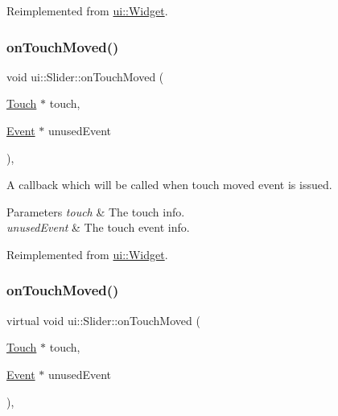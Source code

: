 Reimplemented from \hyperlink{classui_1_1Widget_ac4d1576dfe1f3cf0a509f2d2ca0c5b90}{ui\+::\+Widget}.

\mbox{\label{classui_1_1Slider_abc18db1077436cc39bebc3e9c245a8a7}} 
\subsubsection{\texorpdfstring{on\+Touch\+Moved()}{onTouchMoved()}\hspace{0.1cm}{\footnotesize\ttfamily [1/2]}}
{\footnotesize\ttfamily void ui\+::\+Slider\+::on\+Touch\+Moved (\begin{DoxyParamCaption}\item[{\hyperlink{classTouch}{Touch} $\ast$}]{touch,  }\item[{\hyperlink{classEvent}{Event} $\ast$}]{unused\+Event }\end{DoxyParamCaption})\hspace{0.3cm}{\ttfamily [override]}, {\ttfamily [virtual]}}

A callback which will be called when touch moved event is issued. 
\begin{DoxyParams}{Parameters}
{\em touch} & The touch info. \\
\hline
{\em unused\+Event} & The touch event info. \\
\hline
\end{DoxyParams}


Reimplemented from \hyperlink{classui_1_1Widget_a16e6247b1c43273eac77623e8f129dd4}{ui\+::\+Widget}.

\mbox{\label{classui_1_1Slider_a4641ca08091646358a0e325b5dcd8fb5}} 
\subsubsection{\texorpdfstring{on\+Touch\+Moved()}{onTouchMoved()}\hspace{0.1cm}{\footnotesize\ttfamily [2/2]}}
{\footnotesize\ttfamily virtual void ui\+::\+Slider\+::on\+Touch\+Moved (\begin{DoxyParamCaption}\item[{\hyperlink{classTouch}{Touch} $\ast$}]{touch,  }\item[{\hyperlink{classEvent}{Event} $\ast$}]{unused\+Event }\end{DoxyParamCaption})\hspace{0.3cm}{\ttfamily [override]}, {\ttfamily [virtual]}}

